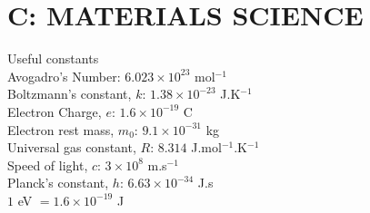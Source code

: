\documentclass[a4paper,10pt]{article}
\begin{document}
\section*{C: MATERIALS SCIENCE}

Useful constants\\
Avogadro's Number: $6.023 \times 10^{23}$ mol$^{-1}$ \\
Boltzmann's constant, $k$: $1.38 \times 10^{-23}$ J.K$^{-1}$ \\
Electron Charge, $e$: $1.6 \times 10^{-19}$ C \\
Electron rest mass, $m_0$: $9.1 \times 10^{-31}$ kg \\
Universal gas constant, $R$: $8.314$ J.mol$^{-1}$.K$^{-1}$ \\
Speed of light, $c$: $3 \times 10^8$ m.s$^{-1}$ \\
Planck's constant, $h$: $6.63 \times 10^{-34}$ J.s \\
$1$ eV $= 1.6 \times 10^{-19}$ J
\end{document}
